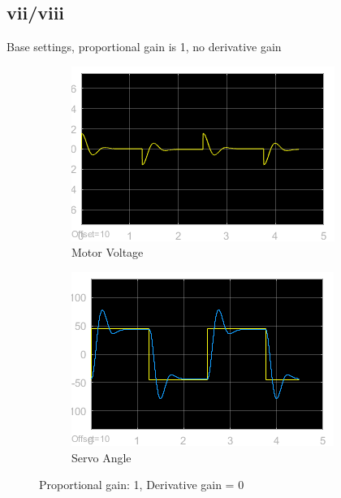 \documentclass[12pt]{article}
\begin{document}
\subsection*{vii/viii} %
Base settings, proportional gain is 1, no derivative gain
\begin{figure}[h!]
    \centering
    \begin{subfigure}[b]{0.49\textwidth}
        \includegraphics[width=\textwidth]{vii_voltage}    
        \caption{Motor Voltage}    
    \end{subfigure}
    \begin{subfigure}[b]{0.49\textwidth}
        \includegraphics[width=\textwidth]{vii_angle}
        \caption{Servo Angle}
    \end{subfigure}
    \caption{\label{fig:vii} Proportional gain: 1, Derivative gain = 0}
\end{figure}
\end{document}
